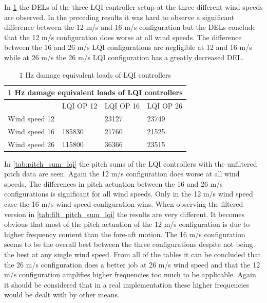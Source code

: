 \newpage

In \cref{tab:del_lqi} the DELs of the three LQI controller setup at the three different wind speeds are observed. In the preceding results it was hard to observe a significant difference between the 12 m/s and 16 m/s configuration but the DELs conclude that the 12 m/s configuration does worse at all wind speeds. The difference between the 16 and 26 m/s LQI configurations are negligible at 12 and 16 m/s while at 26 m/s the 26 m/s LQI configuration has a greatly decreased DEL.

\begin{table}[ht]
	\centering
	\caption{1 Hz damage equivalent loads of LQI controllers}
	\label{tab:del_lqi}
	\begin{tabular}{@{}|llll|@{}}
		\toprule
		\multicolumn{4}{|c|}{1 Hz damage equivalent loads of LQI controllers}                                                                                                                                \\ \midrule
		\multicolumn{1}{|l|}{}              & \multicolumn{1}{l|}{LQI OP 12}                                            & \multicolumn{1}{l|}{LQI OP 16}                     & LQI OP 26                     \\ \midrule
		\multicolumn{1}{|l|}{Wind speed 12} & \multicolumn{1}{l|}{\cellcolor[HTML]{FFCCC9}{\color[HTML]{333333} 24132}} & \multicolumn{1}{l|}{\cellcolor[HTML]{9AFF99}23127} & 23749                         \\ \midrule
		\multicolumn{1}{|l|}{Wind speed 16} & \multicolumn{1}{l|}{\cellcolor[HTML]{FFCCC9}185830}                       & \multicolumn{1}{l|}{21760}                         & \cellcolor[HTML]{9AFF99}21525 \\ \midrule
		\multicolumn{1}{|l|}{Wind speed 26} & \multicolumn{1}{l|}{\cellcolor[HTML]{FFCCC9}115800}                       & \multicolumn{1}{l|}{36366}                         & \cellcolor[HTML]{9AFF99}23515 \\ \bottomrule
	\end{tabular}
\end{table}

In \cref{tab:pitch_sum_lqi} the pitch sums of the LQI controllers with the unfiltered pitch data are seen. Again the 12 m/s configuration does worse at all wind speeds. The differences in pitch actuation between the 16 and 26 m/s configurations is significant for all wind speeds. Only in the 12 m/s wind speed case the 16 m/s wind speed configuration wins. When observing the filtered version in \cref{tab:filt_pitch_sum_lqi} the results are very different. It becomes obvious that most of the pitch actuation of the 12 m/s configuration is due to higher frequency content than the fore-aft motion. The 16 m/s configuration seems to be the overall best between the three configurations despite not being the best at any single wind speed. From all of the tables it can be concluded that the 26 m/s configuration does a better job at 26 m/s wind speed and that the 12 m/s configuration amplifies higher frequencies too much to be applicable. Again it should be considered that in a real implementation these higher frequencies would be dealt with by other means.

